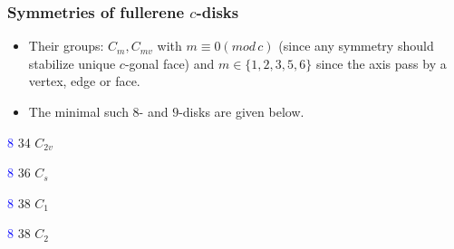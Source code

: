 \documentclass{beamer}
\begin{document}
\begin{frame}\frametitle{Symmetries of fullerene $c$-disks} 
\vspace{-3mm}
\begin{itemize}
\item Their groups:  $C_{m},C_{mv}$ with $m\equiv 0(mod\,c)$ (since any 
symmetry should 
stabilize unique $c$-gonal face) and $m\in \{1,2,3,5,6\}$ 
since the axis pass by a vertex, edge or face.
\item The minimal such 
$8$- and $9$-disks are given below.  
\end{itemize}
\begin{center}
\begin{minipage}[b]{24mm}\centering
{}\par
\textcolor{blue}{$8$} 34 $C_{2v}$
\end{minipage}
\begin{minipage}[b]{24mm}
\centering  
{}\par
\textcolor{blue}{$8$} 36 $C_s$
\end{minipage}
\begin{minipage}[b]{24mm}
\centering
{}\par
\textcolor{blue}{$8$} 38 $C_{1}$
\end{minipage}
\begin{minipage}[b]{24mm}
\centering    
{}\par
\textcolor{blue}{$8$} 38 $C_{2}$
\end{minipage}
\end{center}
\vspace{-2mm} 


\end{frame}
\end{document}
